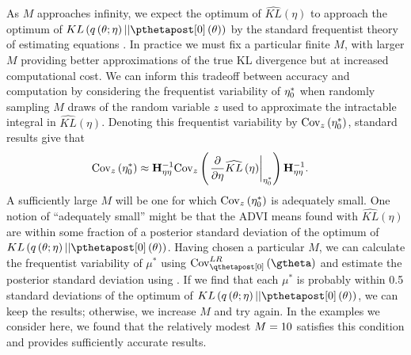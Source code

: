 \documentclass{article}\usepackage[]{graphicx}\usepackage[]{color}
\theoremstyle{definition}
\theoremstyle{plain}
\theoremstyle{plain}
\theoremstyle{plain}
\theoremstyle{definition}
\theoremstyle{plain}
\theoremstyle{plain}
\begin{document}
As $M$ approaches infinity, we expect the optimum of
$\widehat{KL}\left(\eta\right)$ to approach the optimum of
$KL\left(q\left(\theta;\eta\right)||\pzeropost\left(\theta\right)\right)$ by the
standard frequentist theory of estimating equations \citep[Chapter
9]{keener:2011:theoretical}.  In practice we must fix a particular finite $M$,
with larger $M$ providing better approximations of the true KL divergence but at
increased computational cost.  We can inform this tradeoff between accuracy and
computation by considering the frequentist variability of $\eta_{0}^{*}$ when
randomly sampling $M$ draws of the random variable $z$ used to approximate the
intractable integral in $\widehat{KL}\left(\eta\right)$. Denoting this
frequentist variability by $\mathrm{Cov}_{z}\left(\eta_{0}^{*}\right)$, standard results
\citep[Chapter 9]{keener:2011:theoretical} give that
\begin{align}
\mathrm{Cov}_{z}\left(\eta_{0}^{*}\right) &
    \approx\mathbf{H}_{\eta\eta}^{-1}\mathrm{Cov}_{z}\left(\left.\frac{\partial}{\partial\eta}
    \widehat{KL}\left(\eta\right)\right|_{\eta_{0}^{*}}\right)\mathbf{H}_{\eta\eta}^{-1}.
    \label{eq:approx_kl_variance_of_eta}
\end{align}
A sufficiently large $M$ will be one for which
$\mathrm{Cov}_{z}\left(\eta_{0}^{*}\right)$ is adequately small. One notion of
``adequately small'' might be that the ADVI means found with
$\widehat{KL}\left(\eta\right)$ are within some fraction of a posterior standard
deviation of the optimum of
$KL\left(q\left(\theta;\eta\right)||\pzeropost\left(\theta\right)\right)$.
Having chosen a particular $M$, we can calculate the frequentist variability of
$\mu^{*}$ using $\lrvbcov\left(\gtheta\right)$ and estimate the posterior
standard deviation using . If we find that
each $\mu^{*}$ is probably within 0.5 standard deviations of the optimum of
$KL\left(q\left(\theta;\eta\right)||\pzeropost\left(\theta\right)\right)$, we
can keep the results; otherwise, we increase $M$ and try again. In the examples
we consider here, we found that the relatively modest $M=10$
satisfies this condition and provides sufficiently accurate results.
\end{document}
